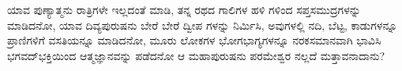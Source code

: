ಯಾವ ಪುಣ್ಯಾತ್ಮನು ರಾತ್ರಿಗಳೇ ಇಲ್ಲದಂತೆ ಮಾಡಿ, ತನ್ನ ರಥದ ಗಾಲಿಗಳ ಹಳಿ ಗಳಿಂದ ಸಪ್ತಸಮುದ್ರಗಳನ್ನು ಮಾಡಿದನೋ, ಯಾವ ದಿವ್ಯಪುರುಷನು ಬೇರೆ ಬೇರೆ ದ್ವೀಪ ಗಳನ್ನು ನಿರ್ಮಿಸಿ, ಅವುಗಳಲ್ಲಿ ನದಿ, ಬೆಟ್ಟ, ಕಾಡುಗಳನ್ನೂ ಪ್ರಾಣಿಗಳಿಗೆ ವಸತಿಯನ್ನೂ ಮಾಡಿದನೋ, ಮೂರು ಲೋಕಗಳ ಭೋಗಭಾಗ್ಯಗಳನ್ನೂ ನರಕಸಮಾನವಾಗಿ ಭಾವಿಸಿ ಭಗವದ್​ಭಕ್ತಿಯಿಂದ ಆತ್ಮಜ್ಞಾನವನ್ನು ಪಡೆದನೋ ಆ ಮಹಾಪುರುಷನು ಪರಮೇಶ್ವರ ನಲ್ಲದೆ ಮತ್ತಾವನಾದಾನು?

